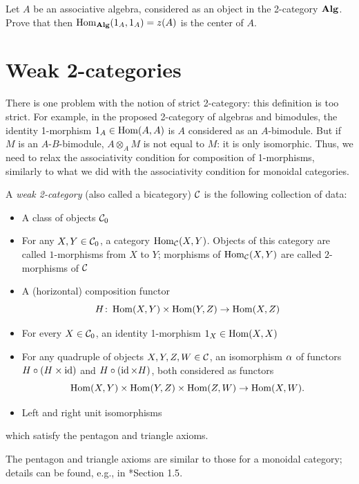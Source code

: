 \begin{exercise}\label{ec:algebra-in-2cat}
  Let $A$ be an associative algebra, considered as an object in the 2-category
  $\mathbf{Alg}$. Prove that then $\operatorname{Hom}_{\mathbf{Alg}}(1_A, 1_A)=z(A)$ is the center of $A$.
\end{exercise}
\section{Weak 2-categories}\label{s:weak-2cat}
There is one problem with the notion of strict 2-category: this definition is
too strict. For example, in the proposed 2-category of algebras and bimodules,
the identity 1-morphism $1_A\in \operatorname{Hom}(A,A)$ is $A$ considered as an $A$-bimodule.
But if $M$ is an $A$-$B$-bimodule, $A\otimes_A M$ is not equal to $M$: it is only
isomorphic. Thus, we need to relax the associativity condition for composition
of 1-morphisms, similarly to what we did with the associativity condition for
monoidal categories.

\begin{definition}\label{d:2-cat-weak}
  A \emph{weak 2-category} (also called a bicategory) $\mathcal{C}$ is the following
  collection of data:
  \begin{itemize}
    \item A class of objects $\mathcal{C}_0$
    \item For any $X, Y\in \mathcal{C}_0$, a category $\operatorname{Hom}_{\mathcal{C}}(X,Y)$. Objects of
      this category are called $1$-morphisms from $X$ to $Y$; morphisms of
      $\operatorname{Hom}_{\mathcal{C}}(X,Y)$ are called $2$-morphisms of $\mathcal{C}$
    \item A (horizontal) composition functor
      $$
        H\colon \operatorname{Hom}(X,Y)\times \operatorname{Hom}(Y,Z)\to \operatorname{Hom}(X,Z)
      $$
    \item For every $X\in \mathcal{C}_0$, an identity 1-morphism $1_X\in \operatorname{Hom}(X,X)$
    \item For any quadruple of objects $X,Y,Z,W\in \mathcal{C}$, an isomorphism
      $\alpha$ of functors $H\circ (H\times \operatorname{id})$ and $H\circ (\operatorname{id} \times H)$,
      both considered as functors
      $$
        \operatorname{Hom}(X,Y)\times \operatorname{Hom}(Y,Z)\times\operatorname{Hom}(Z,W)\to \operatorname{Hom}(X,W).
      $$
    \item Left and right unit isomorphisms
  \end{itemize}
  which satisfy the pentagon and triangle axioms.
\end{definition}
The pentagon and triangle axioms are similar to those for a monoidal category;
details can be found, e.g., in *{Section 1.5}.


